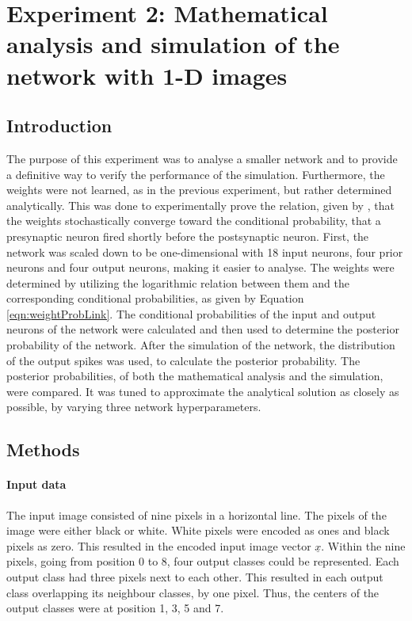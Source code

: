 \section{Experiment 2: Mathematical analysis and simulation of the network with 1-D images}
\label{section:1D}

\subsection{Introduction}

The purpose of this experiment was to analyse a smaller network and to provide a definitive way to verify the performance of the simulation. Furthermore, the weights were not learned, as in the previous experiment, but rather determined analytically. This was done to experimentally prove the relation, given by \citet{nessler}, that the weights stochastically converge toward the conditional probability, that a presynaptic neuron fired shortly before the postsynaptic neuron.
First, the network was scaled down to be one-dimensional with 18 input neurons, four prior neurons and four output neurons, making it easier to analyse. The weights were determined by utilizing the logarithmic relation between them and the corresponding conditional probabilities, as given by Equation \ref{eqn:weightProbLink}. The conditional probabilities of the input and output neurons of the network  were calculated and then used to determine the posterior probability of the network. After the simulation of the network, the distribution of the output spikes was used, to calculate the posterior probability. The posterior probabilities, of both the mathematical analysis and the simulation, were compared. It was tuned to approximate the analytical solution as closely as possible, by varying three network hyperparameters.

\subsection{Methods}

\paragraph{Input data}
The input image consisted of nine pixels in a horizontal line. The pixels of the image were either black or white. White pixels were encoded as ones and black pixels as zero. This resulted in the encoded input image vector $\underline{x}$. Within the nine pixels, going from position 0 to 8, four output classes could be represented. Each output class had three pixels next to each other. This resulted in each output class overlapping its neighbour classes, by one pixel. Thus, the centers of the output classes were at position 1, 3, 5 and 7.

